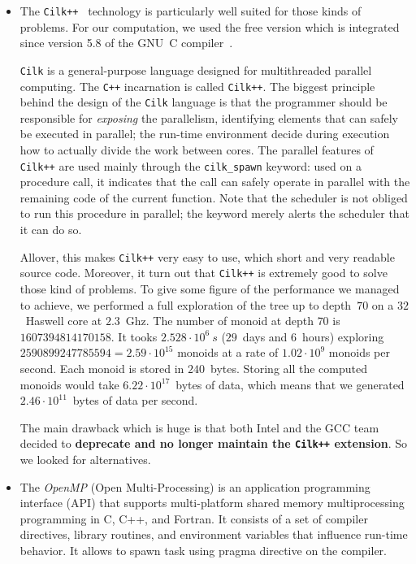 \documentclass{deliverablereport}
\newcommand{\Cilk}{\texttt{Cilk}\xspace}
\newcommand{\CilkP}{\texttt{Cilk++}\xspace}
\newcommand{\CPP}{\texttt{C++}\xspace}
\begin{document}
\begin{itemize}
\item The \CilkP~\cite{CilkIntel} technology is particularly well suited for
  those kinds of problems. For our computation, we used the free version which
  is integrated since version 5.8 of the GNU~C compiler~\cite{GCCcilk}.

  \Cilk is a general-purpose language designed for multithreaded parallel
  computing. The \CPP incarnation is called \CilkP. The biggest principle
  behind the design of the \Cilk language is that the programmer should be
  responsible for \emph{exposing} the parallelism, identifying elements that
  can safely be executed in parallel; the run-time environment decide during
  execution how to actually divide the work between cores. The parallel
  features of \CilkP are used mainly through the \texttt{cilk\_spawn} keyword:
  used on a procedure call, it indicates that the call can safely operate in
  parallel with the remaining code of the current function. Note that the
  scheduler is not obliged to run this procedure in parallel; the keyword
  merely alerts the scheduler that it can do so.

  Allover, this makes \CilkP very easy to use, which short and very readable
  source code. Moreover, it turn out that \CilkP is extremely good to solve
  those kind of problems.  To give some figure of the performance we managed
  to achieve, we performed a full exploration of the tree up to depth~$70$ on
  a $32$~Haswell core at $2.3$~Ghz. The number of monoid at depth $70$ is
  $1607394814170158$.  It tooks $2.528\cdot10^{6}~s$ ($29$~days and $6$~hours)
  exploring $2590899247785594=2.59\cdot10^{15}$ monoids at a rate of
  $1.02\cdot10^{9}$ monoids per second. Each monoid is stored in
  $240$~bytes. Storing all the computed monoids would take
  $6.22\cdot10^{17}$~bytes of data, which means that we generated
  $2.46\cdot10^{11}$~bytes of data per second.

  The main drawback which is huge is that both Intel and the GCC team decided
  to \textbf{deprecate and no longer maintain the \CilkP extension}. So we
  looked for alternatives.


\item The \emph{OpenMP} (Open Multi-Processing) is an application programming
  interface (API) that supports multi-platform shared memory multiprocessing
  programming in C, C++, and Fortran. It consists of a set of compiler
  directives, library routines, and environment variables that influence
  run-time behavior. It allows to spawn task using pragma directive on the
  compiler.


\end{itemize}
\end{document}
